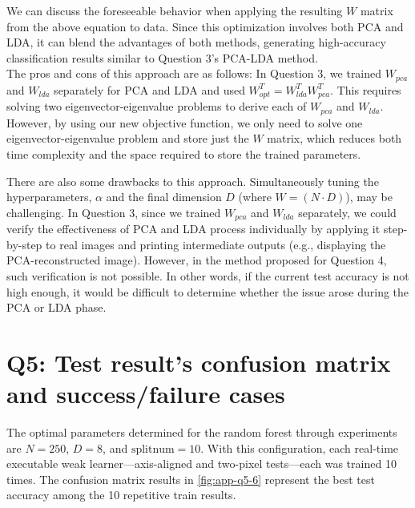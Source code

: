 We can discuss the foreseeable behavior when applying the resulting $W$ matrix from the above equation to data. Since this optimization involves both PCA and LDA, it can blend the advantages of both methods, generating high-accuracy classification results similar to Question 3's PCA-LDA method.\\

The pros and cons of this approach are as follows: In Question 3, we trained $W_{pca}$ and $W_{lda}$ separately for PCA and LDA and used $W_{opt}^T = W_{lda}^T W_{pca}^T$. This requires solving two eigenvector-eigenvalue problems to derive each of $W_{pca}$ and $W_{lda}$. However, by using our new objective function, we only need to solve one eigenvector-eigenvalue problem and store just the $W$ matrix, which reduces both time complexity and the space required to store the trained parameters.

There are also some drawbacks to this approach. Simultaneously tuning the hyperparameters, $\alpha$ and the final dimension $D$ (where $W = (N \cdot D)$), may be challenging. In Question 3, since we trained $W_{pca}$ and $W_{lda}$ separately, we could verify the effectiveness of PCA and LDA process individually by applying it step-by-step to real images and printing intermediate outputs (e.g., displaying the PCA-reconstructed image). However, in the method proposed for Question 4, such verification is not possible. In other words, if the current test accuracy is not high enough, it would be difficult to determine whether the issue arose during the PCA or LDA phase.


\section{Q5: Test result's confusion matrix and success/failure cases }
\label{subsec:Q5-1}
The optimal parameters determined for the random forest through experiments are $N=250$, $D=8$, and $\text{splitnum}=10$. With this configuration, each real-time executable weak learner—axis-aligned and two-pixel tests—each was trained 10 times. The confusion matrix results in \cref{fig:app-q5-6} represent the best test accuracy among the 10 repetitive train results.

